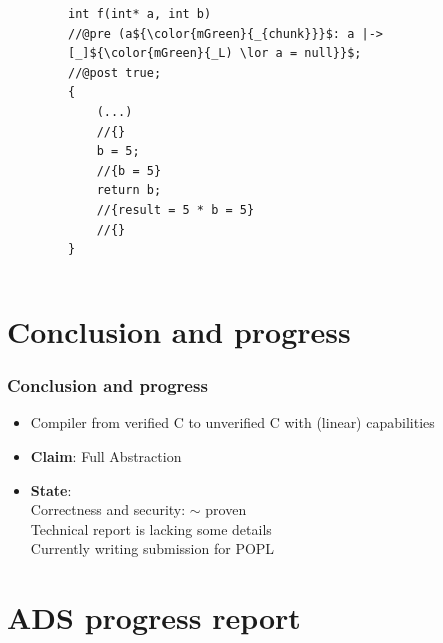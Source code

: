 \documentclass{beamer}
\begin{document}
\begin{frame}[fragile]
\begin{columns}
\begin{column}{0.08\textwidth}
\end{column}

\begin{column}{0.56\textwidth}

\begin{figure}[h]
  \centering
\begin{lstlisting}[style=CStyleNoNum, captionpos = t,title = Source]
int f(int* a, int b)
//@pre (a${\color{mGreen}{_{chunk}}}$: a |-> [_]${\color{mGreen}{_L) \lor a = null}}$;
//@post true;
{
	(...)
	//{}
	b = 5;
	//{b = 5} 
	return b;
	//{result = 5 * b = 5}
	//{}
}
\end{lstlisting}
\end{figure}   

\end{column}
\end{columns}

\end{frame}
\fi
\section{Conclusion and progress}

\begin{frame}
\frametitle{Conclusion and progress}
\begin{itemize}
\item Compiler from verified C to unverified C with (linear) capabilities 
\item \textbf{Claim}: Full Abstraction\\
\item \textbf{State}: \\
\qquad Correctness and security: $\sim$ proven\\
  \qquad\qquad Technical report is lacking some details\\
 \qquad Currently writing submission for POPL\\
\end{itemize}
\end{frame}

\section{ADS progress report}
\end{document}
